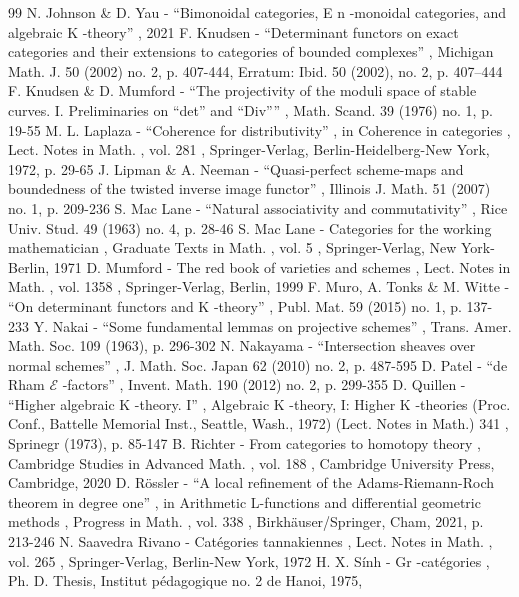 \documentclass[11pt]{article}
\theoremstyle{plain}
\theoremstyle{definition}
\begin{document}
\begin{thebibliography}{99}
 N. Johnson \& D. Yau - “Bimonoidal categories, E n -monoidal categories, and algebraic K -theory” , 2021
 F. Knudsen - “Determinant functors on exact categories and their extensions to categories of bounded complexes” , Michigan Math. J. 50 (2002) no. 2, p. 407-444, Erratum: Ibid. 50 (2002), no. 2, p. 407–444
 F. Knudsen \& D. Mumford - “The projectivity of the moduli space of stable curves. I. Preliminaries on “det” and “Div”” , Math. Scand. 39 (1976) no. 1, p. 19-55
 M. L. Laplaza - “Coherence for distributivity” , in Coherence in categories , Lect. Notes in Math. , vol. 281 , Springer-Verlag, Berlin-Heidelberg-New York, 1972, p. 29-65
 J. Lipman \& A. Neeman - “Quasi-perfect scheme-maps and boundedness of the twisted inverse image functor” , Illinois J. Math. 51 (2007) no. 1, p. 209-236
 S. Mac Lane - “Natural associativity and commutativity” , Rice Univ. Stud. 49 (1963) no. 4, p. 28-46
 S. Mac Lane - Categories for the working mathematician , Graduate Texts in Math. , vol. 5 , Springer-Verlag, New York-Berlin, 1971
 D. Mumford - The red book of varieties and schemes , Lect. Notes in Math. , vol. 1358 , Springer-Verlag, Berlin, 1999
 F. Muro, A. Tonks \& M. Witte - “On determinant functors and K -theory” , Publ. Mat. 59 (2015) no. 1, p. 137-233
 Y. Nakai - “Some fundamental lemmas on projective schemes” , Trans. Amer. Math. Soc. 109 (1963), p. 296-302
 N. Nakayama - “Intersection sheaves over normal schemes” , J. Math. Soc. Japan 62 (2010) no. 2, p. 487-595
 D. Patel - “de Rham $\mathcal{E}$ -factors” , Invent. Math. 190 (2012) no. 2, p. 299-355
 D. Quillen - “Higher algebraic K -theory. I” , Algebraic K -theory, I: Higher K -theories (Proc. Conf., Battelle Memorial Inst., Seattle, Wash., 1972) (Lect. Notes in Math.) 341 , Sprinegr (1973), p. 85-147
 B. Richter - From categories to homotopy theory , Cambridge Studies in Advanced Math. , vol. 188 , Cambridge University Press, Cambridge, 2020
 D. Rössler - “A local refinement of the Adams-Riemann-Roch theorem in degree one” , in Arithmetic L-functions and differential geometric methods , Progress in Math. , vol. 338 , Birkhäuser/Springer, Cham, 2021, p. 213-246
 N. Saavedra Rivano - Catégories tannakiennes , Lect. Notes in Math. , vol. 265 , Springer-Verlag, Berlin-New York, 1972
 H. X. Sính - Gr -catégories , Ph. D. Thesis, Institut pédagogique no. 2 de Hanoi, 1975,

\end{thebibliography}
\end{document}
